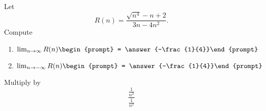\documentclass{ximera}
\author{Bart Snapp}
\begin{document}
\begin{exercise}
Let 
\[
R(n) = \frac{\sqrt{n^4}-n+2}{3 n-4 n^2}.
\]
Compute
\begin{enumerate}
\item $\lim_{n\to \infty} R(n) \begin{prompt} = \answer{-\frac{1}{4}}\end{prompt}$
\item $\lim_{n\to -\infty}R(n) \begin{prompt} = \answer{-\frac{1}{4}}\end{prompt}$
\end{enumerate}
\begin{hint}
Multiply by
\[
\frac{\frac{1}{n^2}}{\frac{1}{n^2}}
\]
\end{hint}
\end{exercise}
\end{document}
